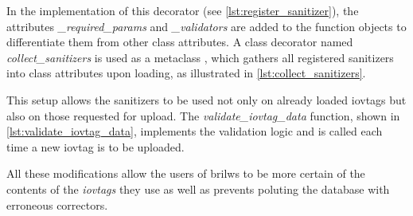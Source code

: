 In the implementation of this decorator (see \autoref{lst:register_sanitizer}), the attributes \textit{\_required\_params} and \textit{\_validators} are added to the function objects to differentiate them from other class attributes. A class decorator named \textit{collect\_sanitizers} is used as a metaclass \cite{pep3115}, which gathers all registered sanitizers into class attributes upon loading, as illustrated in \autoref{lst:collect_sanitizers}.

This setup allows the sanitizers to be used not only on already loaded iovtags but also on those requested for upload. The \textit{validate\_iovtag\_data} function, shown in \autoref{lst:validate_iovtag_data}, implements the validation logic and is called each time a new iovtag is to be uploaded.

All these modifications allow the users of brilws to be more certain of the contents of the \textit{iovtags} they use as well as prevents poluting the database with erroneous correctors.






